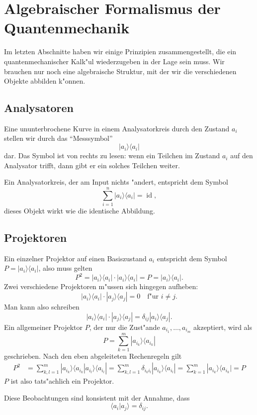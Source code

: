 \section{Algebraischer Formalismus der Quantenmechanik}
Im letzten Abschnitte haben wir einige Prinzipien zusammengestellt,
die ein quantenmechanischer Kalk"ul wiederzugeben in der Lage sein muss.
Wir brauchen nur noch eine algebraische Struktur, mit der wir die 
verschiedenen Objekte abbilden k"onnen.

\subsection{Analysatoren}
Eine ununterbrochene Kurve in einem Analysatorkreis durch den Zustand
$a_i$ stellen wir durch das ``Messsymbol'' 
\[
|a_i\rangle\langle a_i|
\]
dar. Das Symbol ist von rechts zu lesen: wenn ein Teilchen
im Zustand $a_i$ auf den Analysator trifft, dann gibt er ein solches
Teilchen weiter.

Ein Analysatorkreis, der am Input nichts "andert, entspricht dem Symbol
\[
\sum_{i=1}^n |a_i\rangle \langle a_i|=\operatorname{id},
\]
dieses Objekt wirkt wie die identische Abbildung.

\subsection{Projektoren}
Ein einzelner Projektor auf einen Basiszustand $a_i$ entspricht dem Symbol
$P= |a_i\rangle\langle a_i|$, also muss gelten
\[
P^2 = 
|a_i\rangle\langle a_i|
\cdot
|a_i\rangle\langle a_i|
=P
=
|a_i\rangle\langle a_i|.
\]
Zwei verschiedene Projektoren m"ussen sich hingegen aufheben:
\[
|a_i\rangle\langle a_i|
\cdot
|a_j\rangle\langle a_j|
=
0 \quad\text{f"ur $i\ne j$}.
\]
Man kann also schreiben
\[
|a_i\rangle\langle a_i|
\cdot
|a_j\rangle\langle a_j|
=\delta_{ij} |a_i\rangle\langle a_j|.
\]
Ein allgemeiner Projektor $P$, der nur die Zust"ande $a_{i_1},\dots ,a_{i_m}$
akzeptiert, wird als
\[
P = \sum_{k=1}^m |a_{i_k}\rangle \langle a_{i_k}|
\]
geschrieben.
Nach den eben abgeleiteten Rechenregeln gilt
\begin{align*}
P^2
&=
\sum_{k,l=1}^m |a_{i_k}\rangle\langle a_{i_k}|a_{i_l}\rangle\langle a_{i_l}|
=
\sum_{k,l=1}^m \delta_{i_ki_l}|a_{i_k}\rangle\langle a_{i_l}|
=
\sum_{k=1}^m |a_{i_k}\rangle\langle a_{i_k}| = P
\end{align*}
$P$ ist also tats"achlich ein Projektor.

Diese Beobachtungen sind konsistent mit der Annahme, dass
\[
\langle a_i|a_j\rangle = \delta_{ij}.
\]


